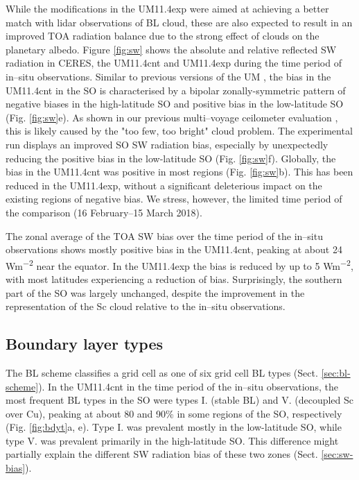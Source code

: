 While the modifications in the UM11.4exp were aimed at achieving a better
match with lidar observations of BL cloud, these are also expected to
result in an improved TOA radiation balance due to the strong effect of
clouds on the planetary albedo. Figure \ref{fig:sw} shows the absolute
and relative reflected SW radiation in CERES, the UM11.4cnt and UM11.4exp
during the time period of in--situ observations. Similar to previous
versions of the UM \citep{kuma2020a,schuddeboom2019}, the bias in the UM11.4cnt
in the SO is characterised by a bipolar zonally-symmetric pattern of negative
biases in the high-latitude SO
and positive bias in the low-latitude SO (Fig. \ref{fig:sw}e).
As shown in our previous multi--voyage ceilometer
evaluation \citep{kuma2020a}, this is likely caused by the "too few, too bright"
cloud problem. The experimental run displays an improved SO SW radiation
bias, especially by unexpectedly reducing the positive bias in the low-latitude SO
(Fig. \ref{fig:sw}f). Globally, the bias in the UM11.4cnt was positive in most
regions (Fig. \ref{fig:sw}b). This has been reduced in the UM11.4exp, without
a significant deleterious impact on the existing regions of negative bias. We stress,
however, the limited time period of the comparison (16 February--15 March 2018).

The zonal average of the TOA SW bias over the time period of the in--situ
observations shows mostly positive bias in the
UM11.4cnt, peaking at about 24 \unit{Wm^{-2}} near the equator. In the
UM11.4exp the bias is reduced by up to 5 \unit{Wm^{-2}}, with most
latitudes experiencing a reduction of bias. Surprisingly, the southern
part of the SO was largely unchanged, despite the improvement in the
representation of the Sc cloud relative to the in--situ observations.

\subsection{Boundary layer types}
\label{sec:bl-types}


The BL scheme classifies a grid cell as one of six grid cell BL types
(Sect. \ref{sec:bl-scheme}). In the UM11.4cnt in the time period of the in--situ observations,
the most frequent BL types in the SO were types I. (stable BL) and V. (decoupled Sc
over Cu), peaking at about 80 and 90\% in some regions of the SO, respectively
(Fig. \ref{fig:bdyt}a, e).
Type I. was prevalent mostly in the low-latitude SO, while type V. was
prevalent primarily in the high-latitude SO. This difference might partially explain
the different SW radiation bias of these two zones (Sect. \ref{sec:sw-bias}).

